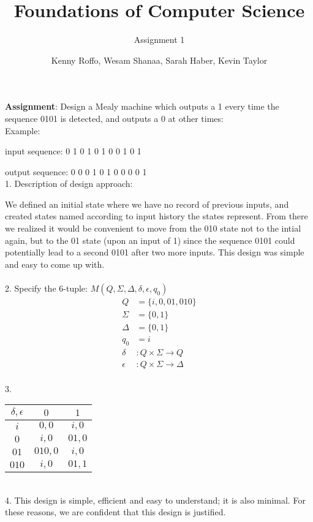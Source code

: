 \documentclass{scrartcl}
\title{Foundations of Computer Science}
\subtitle{Assignment 1}
\author{Kenny Roffo, Wesam Shanaa, Sarah Haber, Kevin Taylor}
\begin{document}
\maketitle

\textbf{Assignment}: Design a Mealy machine which outputs a 1 every time the sequence 0101 is detected, and outputs a 0 at other times:\\

Example:

input sequence: 0 1 0 1 0 1 0 0 1 0 1

output sequence: 0 0 0 1 0 1 0 0 0 0 1\\


1. Description of design approach:

We defined an initial state where we have no record of previous inputs, and created states named according to input history the states represent. From there we realized it would be convenient to move from the 010 state not to the intial again, but to the 01 state (upon an input of 1) since the sequence 0101 could potentially lead to a second 0101 after two more inputs. This design was simple and easy to come up with.\\
\\
2. Specify the 6-tuple: $M(Q,\Sigma,\Delta,\delta,\epsilon,q_0)$
\begin{align*}
Q&=\{i,0,01,010\}\\
\Sigma&=\{0,1\}\\
\Delta&=\{0,1\}\\
q_0&=i\\
\delta&:Q \times \Sigma \rightarrow Q\\
\epsilon&: Q \times \Sigma \rightarrow \Delta
\end{align*}\ \\

3.
\begin{center}
\begin{tabular} {|c|c c|}
\hline
$\delta,\epsilon$&$0$&$1$\\
\hline
$i$&$0,0$&$i,0$\\
$0$&$i,0$&$01,0$\\
$01$&$010,0$&$i,0$\\
$010$&$i,0$&$01,1$\\
\hline
\end{tabular}
\end{center}\ \\

4. This design is simple, efficient and easy to understand; it is also minimal. For these reasons, we are confident that this design is justified.
\end{document}

